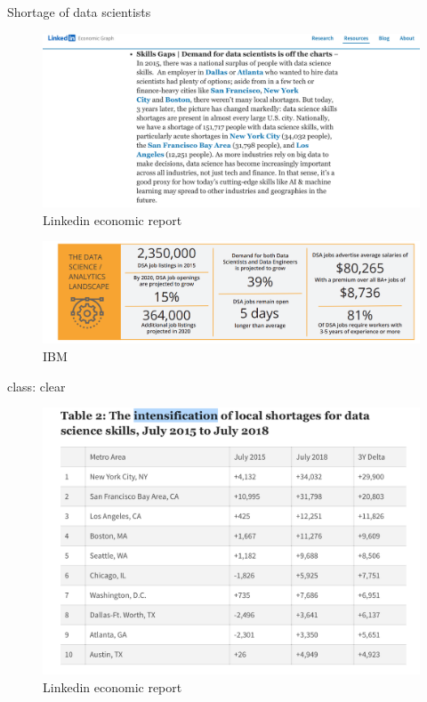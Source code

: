 \documentclass[
  ignorenonframetext,
]{beamer}
\begin{document}
\begin{frame}{Shortage of data scientists}
\protect\hypertarget{shortage-of-data-scientists}{}
\begin{figure}

{\centering \includegraphics[width=0.7\linewidth]{figures/linkedin1} 

}

\caption{Linkedin economic report}\label{fig:unnamed-chunk-5}
\end{figure}

\begin{figure}

{\centering \includegraphics[width=0.7\linewidth]{figures/ibm} 

}

\caption{IBM}\label{fig:unnamed-chunk-6}
\end{figure}

class: clear

\begin{figure}

{\centering \includegraphics[width=0.7\linewidth]{figures/linkedin_shortage} 

}

\caption{Linkedin economic report}\label{fig:unnamed-chunk-8}
\end{figure}
\end{frame}
\end{document}
